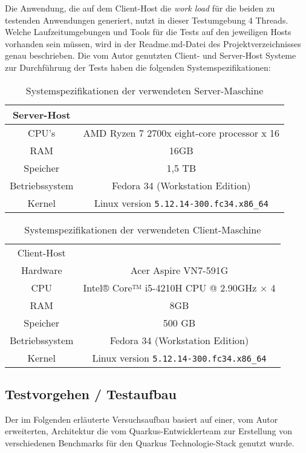 Die Anwendung, die auf dem Client-Host die \textit{work load} für die beiden zu testenden Anwendungen generiert,
 nutzt in dieser Testumgebung 4 Threads.
Welche Laufzeitumgebungen und Tools für die Tests auf den jeweiligen Hosts vorhanden sein müssen, 
wird in der Readme.md-Datei des Projektverzeichnisses genau beschrieben.
Die vom Autor genutzten Client- und Server-Host Systeme zur Durchführung der Tests haben die folgenden Systemspezifikationen:

\begin{table}[ht!]
    \centering
    \begin{tabular}{| c | c |}
        \hline
        Server-Host \\
        \hline
        CPU's    & AMD Ryzen 7 2700x eight-core processor x 16  \\
        \hline
        RAM      & 16GB \\
        \hline
        Speicher & 1,5 TB \\
        \hline
        Betriebssystem   & Fedora 34 (Workstation Edition)  \\
        \hline
        Kernel & Linux version \verb|5.12.14-300.fc34.x86_64|\\
        \hline
    \end{tabular}
    \caption{Systemspezifikationen der verwendeten Server-Maschine}
    \label{table:system_host}
\end{table}

\begin{table}[ht!]
    \centering
    \begin{tabular}{| c | c |}
        \hline
        Client-Host\\
        Hardware & Acer Aspire VN7-591G \\
        \hline
        CPU      & Intel® Core™ i5-4210H CPU @ 2.90GHz × 4  \\
        \hline
        RAM      & 8GB \\
        \hline
        Speicher & 500 GB   \\
        \hline
        Betriebssystem  & Fedora 34 (Workstation Edition)   \\
        \hline
        Kernel & Linux version \verb|5.12.14-300.fc34.x86_64| \\
        \hline
    \end{tabular}
    \caption{Systemspezifikationen der verwendeten Client-Maschine}
    \label{table:system_client}
\end{table}

\subsection{Testvorgehen / Testaufbau}
\label{section:vorgehen}
Der im Folgenden erläuterte Versuchsaufbau basiert auf einer, vom Autor erweiterten, Architektur die vom Quarkus-Entwicklerteam 
  zur Erstellung von verschiedenen Benchmarks für den Quarkus Technologie-Stack genutzt wurde. 
  \parencite{QuarkusBlog, QuarkusJohnaohara}

